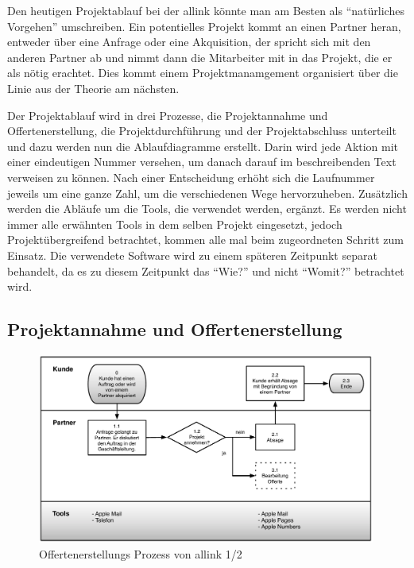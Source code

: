 Den heutigen Projektablauf bei der allink könnte man am Besten als ``natürliches Vorgehen''
umschreiben. Ein potentielles Projekt kommt an einen Partner heran, entweder über 
eine Anfrage oder eine Akquisition, der spricht sich mit den anderen Partner ab 
und nimmt dann die Mitarbeiter mit in das Projekt, die er als nötig erachtet.
Dies kommt einem Projektmanamgement organisiert über die Linie aus der Theorie
am nächsten.

Der Projektablauf wird in drei Prozesse, die Projektannahme und Offertenerstellung,
die Projektdurchführung und der Projektabschluss unterteilt und dazu werden nun die 
Ablaufdiagramme erstellt. Darin wird jede Aktion mit einer eindeutigen Nummer versehen,
um danach darauf im beschreibenden Text verweisen zu können. Nach einer Entscheidung erhöht
sich die Laufnummer jeweils um eine ganze Zahl, um die verschiedenen Wege hervorzuheben.
Zusätzlich werden die Abläufe um die Tools, die verwendet werden, ergänzt.
Es werden nicht immer alle erwähnten Tools in dem selben Projekt eingesetzt,
jedoch Projektübergreifend betrachtet, kommen alle mal beim zugeordneten Schritt 
zum Einsatz. Die verwendete Software wird zu einem späteren Zeitpunkt separat
behandelt, da es zu diesem Zeitpunkt das ``Wie?'' und nicht ``Womit?'' betrachtet
wird.

\clearpage

\subsection{Projektannahme und Offertenerstellung}

\begin{figure}[p]
\begin{center}
\includegraphics[width=0.99\textwidth,angle=0]{./bilder/analyse/01_ist_prozesse_offerte_01.pdf}
\caption[Offertenerstellungs Prozess von allink 1/2]{Offertenerstellungs 
    Prozess von allink 1/2\footnotemark}
\label{pic:01_ist_prozesse_offerte_01}
\end{center}
\end{figure}


